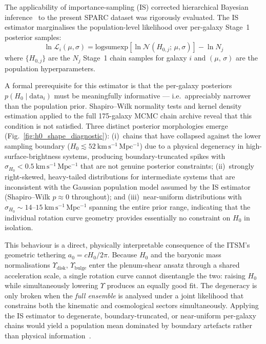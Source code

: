 \documentclass[aps,prd,10pt,twocolumn,superscriptaddress,nofootinbib,floatfix]{revtex4-2}
\begin{document}
The applicability of importance-sampling (IS) corrected hierarchical Bayesian inference~\cite{mandel2019} to the present SPARC dataset was rigorously evaluated. The IS estimator marginalises the population-level likelihood over per-galaxy Stage~1 posterior samples:
\begin{equation}
\ln \mathcal{L}_i(\mu, \sigma) = \mathrm{logsumexp}\!\left[\ln \mathcal{N}(H_{0,j};\,\mu,\sigma)\right] - \ln N_j
\end{equation}
where $\{H_{0,j}\}$ are the $N_j$ Stage~1 chain samples for galaxy $i$ and $(\mu,\,\sigma)$ are the population hyperparameters.

A formal prerequisite for this estimator is that the per-galaxy posteriors $p(H_0 \mid \mathrm{data}_i)$ must be meaningfully informative --- i.e.\ appreciably narrower than the population prior. Shapiro--Wilk normality tests and kernel density estimation applied to the full 175-galaxy MCMC chain archive reveal that this condition is not satisfied. Three distinct posterior morphologies emerge (Fig.~\ref{fig:h0_shape_diagnostic}): (i)~chains that have collapsed against the lower sampling boundary ($H_0 \lesssim 52\ \mathrm{km\,s^{-1}\,Mpc^{-1}}$) due to a physical degeneracy in high-surface-brightness systems, producing boundary-truncated spikes with $\sigma_{H_0} < 0.5\ \mathrm{km\,s^{-1}\,Mpc^{-1}}$ that are not genuine posterior constraints; (ii)~strongly right-skewed, heavy-tailed distributions for intermediate systems that are inconsistent with the Gaussian population model assumed by the IS estimator (Shapiro--Wilk $p \approx 0$ throughout); and (iii)~near-uniform distributions with $\sigma_{H_0} \sim 14$--$15\ \mathrm{km\,s^{-1}\,Mpc^{-1}}$ spanning the entire prior range, indicating that the individual rotation curve geometry provides essentially no constraint on $H_0$ in isolation.

This behaviour is a direct, physically interpretable consequence of the ITSM's geometric tethering $a_0 = cH_0/2\pi$. Because $H_0$ and the baryonic mass normalisations $\Upsilon_{\mathrm{disk}},\,\Upsilon_{\mathrm{bulge}}$ enter the plenum-shear ansatz through a shared acceleration scale, a single rotation curve cannot disentangle the two: raising $H_0$ while simultaneously lowering $\Upsilon$ produces an equally good fit. The degeneracy is only broken when the \emph{full ensemble} is analysed under a joint likelihood that constrains both the kinematic and cosmological sectors simultaneously. Applying the IS estimator to degenerate, boundary-truncated, or near-uniform per-galaxy chains would yield a population mean dominated by boundary artefacts rather than physical information~\cite{thrane2019,hogg2010}.
\end{document}
